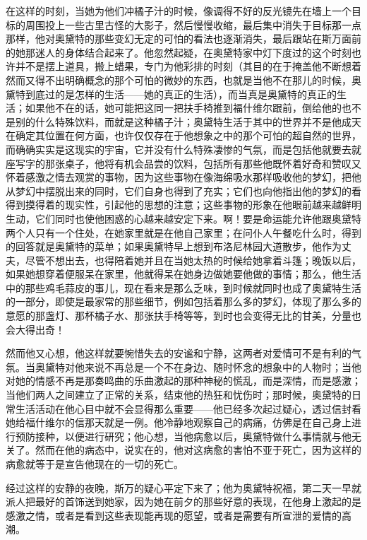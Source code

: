 \par 在这样的时刻，当她为他们冲橘子汁的时候，像调得不好的反光镜先在墙上一个目标的周围投上一些古里古怪的大影子，然后慢慢收缩，最后集中消失于目标那一点那样，他对奥黛特的那些变幻无定的可怕的看法也逐渐消失，最后跟站在斯万面前的她那迷人的身体结合起来了。他忽然起疑，在奥黛特家中灯下度过的这个时刻也许并不是摆上道具，搬上蜡果，专门为他彩排的时刻（其目的在于掩盖他不断想着然而又得不出明确概念的那个可怕的微妙的东西，也就是当他不在那儿的时候，奥黛特到底过的是怎样的生活——她的真正的生活），而当真是奥黛特的真正的生活；如果他不在的话，她可能把这同一把扶手椅推到福什维尔跟前，倒给他的也不是别的什么特殊饮料，而就是这种橘子汁；奥黛特生活于其中的世界并不是他成天在确定其位置在何方面，也许仅仅存在于他想象之中的那个可怕的超自然的世界，而确确实实是这现实的宇宙，它并没有什么特殊凄惨的气氛，而是包括他就要去就座写字的那张桌子，他将有机会品尝的饮料，包括所有那些他既怀着好奇和赞叹又怀着感激之情去观赏的事物，因为这些事物在像海绵吸水那样吸收他的梦幻，把他从梦幻中摆脱出来的同时，它们自身也得到了充实；它们也向他指出他的梦幻的看得到摸得着的现实性，引起他的思想的注意；这些事物的形象在他眼前越来越鲜明生动，它们同时也使他困惑的心越来越安定下来。啊！要是命运能允许他跟奥黛特两个人只有一个住处，在她家里就是在他自己家里；在问仆人午餐吃什么时，得到的回答就是奥黛特的菜单；如果奥黛特早上想到布洛尼林园大道散步，他作为丈夫，尽管不想出去，也得陪着她并且在当她太热的时候给她拿着斗篷；晚饭以后，如果她想穿着便服呆在家里，他就得呆在她身边做她要他做的事情；那么，他生活中的那些鸡毛蒜皮的事儿，现在看来是那么乏味，到时候就同时也成了奥黛特生活的一部分，即使是最家常的那些细节，例如包括着那么多的梦幻，体现了那么多的意愿的那盏灯、那杯橘子水、那张扶手椅等等，到时也会变得无比的甘美，分量也会大得出奇！
\par 然而他又心想，他这样就要惋惜失去的安谧和宁静，这两者对爱情可不是有利的气氛。当奥黛特对他来说不再总是一个不在身边、随时怀念的想象中的人物时；当他对她的情感不再是那奏鸣曲的乐曲激起的那种神秘的慌乱，而是深情，而是感激；当他们两人之间建立了正常的关系，结束他的热狂和忧伤时；那时候，奥黛特的日常生活活动在他心目中就不会显得那么重要——他已经多次起过疑心，透过信封看她给福什维尔的信那天就是一例。他冷静地观察自己的病痛，仿佛是在自己身上进行预防接种，以便进行研究；他心想，当他病愈以后，奥黛特做什么事情就与他无关了。然而在他的病态中，说实在的，他对这病愈的害怕不亚于死亡，因为这样的病愈就等于是宣告他现在的一切的死亡。
\par 经过这样的安静的夜晚，斯万的疑心平定下来了；他为奥黛特祝福，第二天一早就派人把最好的首饰送到她家，因为她在前夕的那些好意的表现，在他身上激起的是感激之情，或者是看到这些表现能再现的愿望，或者是需要有所宣泄的爱情的高潮。
